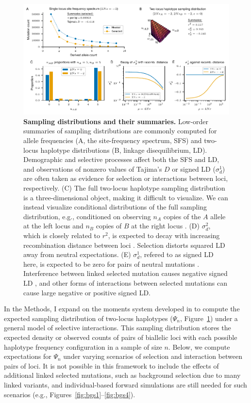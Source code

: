 \documentclass[]{article}
\begin{document}
\begin{figure}[tb!]
    \centering
    \includegraphics{../figures/two-locus-spectrum/stats_summaries}
    \caption{
        \textbf{Sampling distributions and their summaries.}
        Low-order summaries of sampling distributions are commonly computed
        for allele frequencies (A, the site-frequency spectrum, SFS)
        and two-locus haplotype distributions (B, linkage disequilibrium, LD).
        Demographic and selective processes affect both the SFS and LD,
        and observations of nonzero values of Tajima's $D$ or signed LD
        ($\sigma_d^1$) are often taken as evidence for selection or interactions
        between loci, respectively.
        (C) The full two-locus haplotype sampling distribution is a three-dimensional
        object, making it difficult to visualize. We can instead visualize conditional
        distributions of the full sampling distribution, e.g., conditioned on observing
        \(n_A\) copies of the \(A\) allele at the left locus and \(n_B\) copies of
        \(B\) at the right locus \citep[e.g.,][]{Hudson2001-sg}.
        (D) $\sigma_d^2$, which is closely related to $r^2$, is expected to decay
        with increasing recombination distance between loci \citep{Ohta1969-ie}.
        Selection distorts squared LD away from neutral expectations.
        (E) $\sigma_d^1$, refered to as signed LD here, is expected to be zero for
        pairs of neutral mutations \citep{Hill1968-vu}. Interference between linked
        selected mutation causes negative signed LD \citep{Hill1966-gv}, and other
        forms of interactions between selected mutations can cause large negative
        or positive signed LD.
    }
    \label{fig:TwoLocusFS}
\end{figure}

In the Methods, I expand on the moments system developed in
\citet{Ragsdale2019-nt} to compute the expected sampling distribution of
two-locus haplotypes (\(\Psi_n\), Figure~\ref{fig:TwoLocusFS}) under a general
model of selective interactions. This sampling distribution stores the expected
density or observed counts of pairs of biallelic loci with each possible
haplotype frequency configuration in a sample of size \(n\). Below, we compute
expectations for \(\Psi_n\) under varying scenarios of selection and
interaction between pairs of loci. It is not possible in this framework to
include the effects of additional linked selected mutations, such as background
selection due to many linked variants, and individual-based forward simulations
are still needed for such scenarios (e.g.,
Figures~\ref{fig:bgs1}--\ref{fig:bgs4}).
\end{document}
